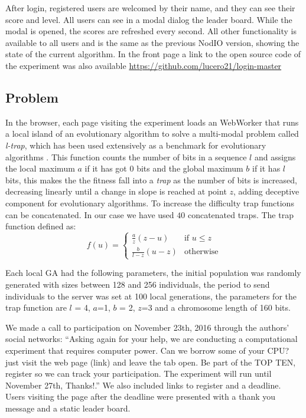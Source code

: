 \documentclass{llncs}
\begin{document}
After login, registered users are welcomed by their name, and they can see
their score and level. All users can see in a modal dialog the leader board.
While the modal is opened, the scores are refreshed every second. All other 
functionality is available to all users and is the same as the previous 
{\sf NodIO} version, showing the state of the current algorithm. 
In the front page a link to the open source code of the experiment was also 
available \url{https://github.com/lucero21/login-master} 


\subsection{Problem}
In the browser, each page visiting the experiment loads an WebWorker
that runs a local island of an evolutionary algorithm to solve a
multi-modal problem called {\em l-trap}, which has been used extensively 
as a benchmark for evolutionary algorithms \cite{fernandes2009using,nijssen2003analysis}. 
This function counts the number of bits in a sequence $l$ and assigns
the local maximum $a$ if it has got 0 bits and the global maximum $b$ if it has $l$
bits, this makes the  the fitness fall into a {\em trap} 
as the number of bits is increased, decreasing linearly until a change in slope 
is reached at point $z$, adding deceptive component for evolutionary algorithms. 
To increase the difficulty trap functions can be concatenated. 
In our case we have used $40$ concatenated traps. The trap function  defined as:   
\[ f(u)= 
    \begin{cases} 
      \frac{a}{z}(z-u) & \text{if } u\leq z\\
      \frac{b}{l-z} (u-z)& \text{otherwise} 
   \end{cases}
\]
%

Each local GA had the following parameters, the initial population was randomly generated 
with sizes between 128 and 256 individuals, the period to send individuals to the server
was set at 100 local generations, the parameters for the trap function are $l$ = 4,
$a$=1, $b$ = 2, $z$=3 and a chromosome length of 160 bits.

We made a call to participation on November 23th, 
2016 through the authors' social networks: ``Asking again for your help, we are conducting a computational experiment
that requires computer power. Can we borrow some of your CPU? just visit the web page (link)
and leave the tab open. Be part of the TOP TEN, register so we can track your participation.
The experiment will run until November 27th, Thanks!.'' We also included links to register and a deadline. Users visiting the page after the deadline were presented with a thank you message and a static leader board. 
%
\end{document}
